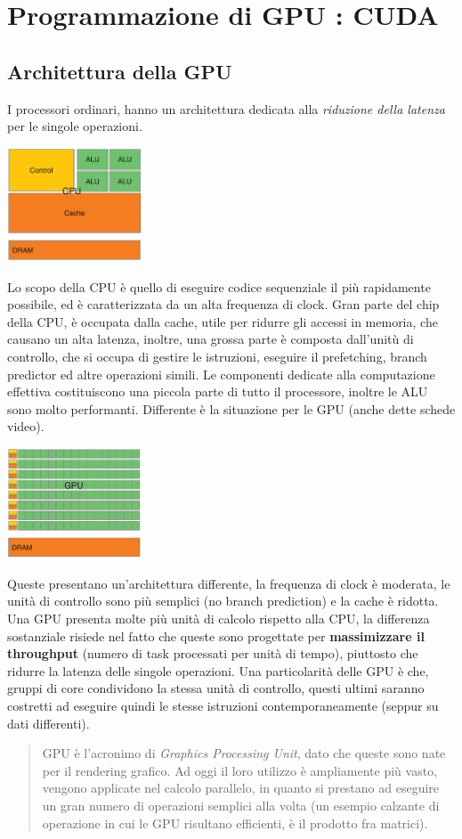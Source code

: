\documentclass[10pt, letterpaper]{report}
\begin{document}
\chapter{Programmazione di GPU : CUDA}
\section{Architettura della GPU}
I processori ordinari, hanno un architettura dedicata alla \textit{riduzione della latenza} per le singole operazioni.
\begin{center}
    \includegraphics[width=0.3\textwidth ]{images/cpu.png}
\end{center}
Lo scopo della CPU è quello di eseguire codice sequenziale  il più rapidamente possibile, ed è caratterizzata da un alta frequenza di clock. Gran parte del chip della CPU, è occupata dalla cache, utile per ridurre gli accessi in memoria, che causano un alta latenza, inoltre, una grossa parte è composta dall'unitù di controllo, che si occupa di gestire le istruzioni, eseguire il prefetching, branch predictor ed altre operazioni simili. \acc 
Le componenti dedicate alla computazione effettiva costituiscono una piccola parte di tutto il processore, inoltre le ALU sono molto performanti. Differente è la situazione per le GPU (anche dette schede video).
\begin{center}
    \includegraphics[width=0.3\textwidth ]{images/GPU.png}
\end{center}
Queste presentano un'architettura differente, la frequenza di clock è moderata, le unità di controllo sono più semplici (no branch prediction) e la cache è ridotta. Una GPU presenta molte più unità di calcolo rispetto alla CPU, la differenza sostanziale risiede nel fatto che queste sono progettate per \textbf{massimizzare il throughput} (numero di task processati per unità di tempo), piuttosto che ridurre la latenza delle singole operazioni. \acc Una particolarità delle GPU è che, gruppi di core condividono la stessa unità di controllo, questi ultimi saranno costretti ad eseguire quindi le stesse istruzioni contemporaneamente (seppur su dati differenti).\begin{quote}
    GPU è l'acronimo di \textit{Graphics Processing Unit}, dato che queste sono nate per il rendering grafico. Ad oggi il loro utilizzo è ampliamente più vasto, vengono applicate nel calcolo parallelo, in quanto si prestano ad eseguire un gran numero di operazioni semplici alla volta (un esempio calzante di operazione in cui le GPU risultano efficienti, è il prodotto fra matrici).
\end{quote}
\end{document}
